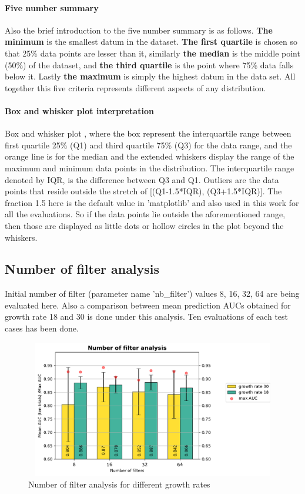\paragraph{Five number summary\\}
Also the brief introduction to the five number summary is as follows. \textbf{The minimum} is the smallest datum in the dataset. \textbf{The first quartile} is chosen so that 25\% data points are lesser than it, similarly \textbf{the median}
is the middle point (50\%) of the dataset, and \textbf{the third quartile} is the point where 75\% data falls below it. Lastly \textbf{the maximum} is simply the highest datum in the data set. All together this five criteria 
represents different aspects of any distribution.

\paragraph{Box and whisker plot interpretation\\}
Box and whisker plot \cite{boxplot}, where the box represent the interquartile range between first quartile 25\% (Q1) and third quartile 75\% (Q3) for the data range, and the orange line is for the median and the extended whiskers display the 
range of the maximum and minimum data points in the distribution. The interquartile range denoted by IQR, is the difference between Q3 and Q1. Outliers are the data points that reside outside the stretch of [(Q1-1.5*IQR), (Q3+1.5*IQR)].
The fraction 1.5 here is the default value in 'matplotlib' and also used in this work for all the evaluations. So if the data points lie outside the aforementioned range, then those are displayed as little dots or hollow circles in the plot 
beyond the whiskers.


\subsection{Number of filter analysis}
Initial number of filter (parameter name 'nb\_filter') values 8, 16, 32, 64 are being evaluated here. Also a comparison between mean prediction AUCs obtained for growth rate 18 and 30 is done under this analysis. Ten evaluations of each test cases has been done.

\begin{figure}[ht]
\centering
\includegraphics[width = 12cm, height=6cm]{images/densenet/siamese/densenet_siamese_nb_filter}
\caption{Number of filter analysis for different growth rates}
\label{fig:nb_filter_vs_auc_growthrate_compare}
\end{figure}

